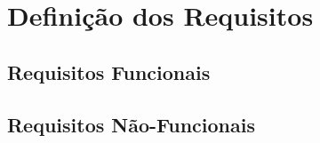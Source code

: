 \chapter{Definição dos Requisitos}

\section{Requisitos Funcionais}

\section{Requisitos Não-Funcionais}